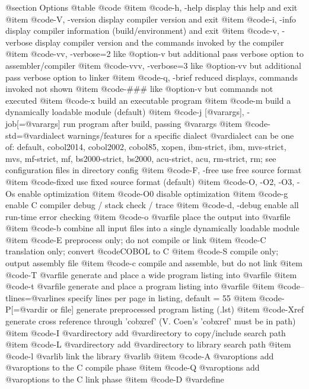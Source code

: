 @section Options
@table @code
@item @code{-h, -help}
display this help and exit
@item @code{-V, -version}
display compiler version and exit
@item @code{-i, -info}
display compiler information (build/environment)
and exit
@item @code{-v, -verbose}
display compiler version and the commands
invoked by the compiler
@item @code{-vv, -verbose=2}
like @option{-v} but additional pass verbose option
to assembler/compiler
@item @code{-vvv, -verbose=3}
like @option{-vv} but additional pass verbose option
to linker
@item @code{-q, -brief}
reduced displays, commands invoked not shown
@item @code{-###}
like @option{-v} but commands not executed
@item @code{-x}
build an executable program
@item @code{-m}
build a dynamically loadable module (default)
@item @code{-j [@var{args}], -job[=@var{args}]}
run program after build, passing @var{args}
@item @code{-std=@var{dialect}}
warnings/features for a specific dialect
@var{dialect} can be one of:
default, cobol2014, cobol2002, cobol85, xopen,
ibm-strict, ibm, mvs-strict, mvs,
mf-strict, mf, bs2000-strict, bs2000,
acu-strict, acu, rm-strict, rm;
see configuration files in directory config
@item @code{-F, -free}
use free source format
@item @code{-fixed}
use fixed source format (default)
@item @code{-O, -O2, -O3, -Os}
enable optimization
@item @code{-O0}
disable optimization
@item @code{-g}
enable C compiler debug / stack check / trace
@item @code{-d, -debug}
enable all run-time error checking
@item @code{-o @var{file}}
place the output into @var{file}
@item @code{-b}
combine all input files into a single
dynamically loadable module
@item @code{-E}
preprocess only; do not compile or link
@item @code{-C}
translation only; convert @code{COBOL} to C
@item @code{-S}
compile only; output assembly file
@item @code{-c}
compile and assemble, but do not link
@item @code{-T @var{file}}
generate and place a wide program listing into @var{file}
@item @code{-t @var{file}}
generate and place a program listing into @var{file}
@item @code{--tlines=@var{lines}}
specify lines per page in listing, default = 55
@item @code{-P[=@var{dir or file}]}
generate preprocessed program listing (.lst)
@item @code{-Xref}
generate cross reference through 'cobxref'
(V. Coen's 'cobxref' must be in path)
@item @code{-I @var{directory}}
add @var{directory} to copy/include search path
@item @code{-L @var{directory}}
add @var{directory} to library search path
@item @code{-l @var{lib}}
link the library @var{lib}
@item @code{-A @var{options}}
add @var{options} to the C compile phase
@item @code{-Q @var{options}}
add @var{options} to the C link phase
@item @code{-D @var{define}}
